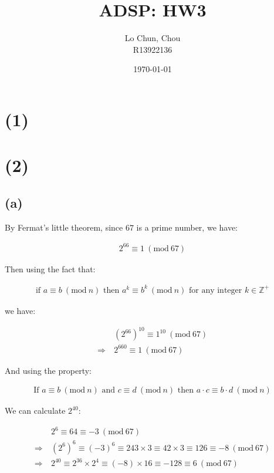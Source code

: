 \documentclass{article}
\title{ADSP: HW3}
\author{Lo Chun, Chou \\ R13922136}
\date\today
\newcommand{\modwos}[1]{\ (\mathrm{mod}\ #1)}
\begin{document}
\setlength{\parindent}{0pt}
\maketitle 

\section*{(1)}

\section*{(2)}

\subsection*{(a)}

By Fermat's little theorem, since $67$ is a prime number, we have:

\begin{align*}
    2^{66} \equiv 1 \modwos{67}
\end{align*}

Then using the fact that:

\begin{align*}
    \text{if } a \equiv b \modwos{n} \text{ then } a^k \equiv b^k \modwos{n} \text{ for any integer } k \in \mathbb{Z}^+
\end{align*}

we have:

\begin{align*}
    &(2^{66})^{10} \equiv 1^{10} \modwos{67} \\
    \Rightarrow \ & 2^{660} \equiv 1 \modwos{67}
\end{align*}

And using the property:

\begin{align*}
    \text{If } a \equiv b \modwos{n} \text{ and } c \equiv d \modwos{n} \text{ then } a \cdot c \equiv b \cdot d \modwos{n}
\end{align*}

We can calculate $2^{40}$:

\begin{align*}
    &2^6 \equiv 64 \equiv -3 \modwos{67} \\
    \Rightarrow \ & (2^6)^6 \equiv (-3)^6 \equiv 243 \times 3 \equiv 42 \times 3 \equiv 126 \equiv -8 \modwos{67} \\
    \Rightarrow \ & 2^{40} \equiv 2^{36} \times 2^4 \equiv (-8) \times 16 \equiv -128 \equiv 6 \modwos{67}
\end{align*}
\end{document}
